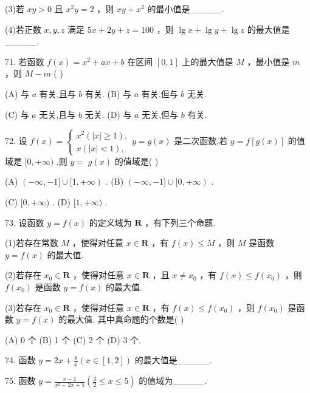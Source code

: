 \documentclass[10pt]{article}
\begin{document}
(3)若 \({xy} > 0\) 且 \({x}^{2}y = 2\) ，则 \({xy} + {x}^{2}\) 的最小值是\_\_\_\_\_.

(4)若正数 \(x,y,z\) 满足 \({5x} + {2y} + z = {100}\) ，则 \(\lg x + \lg y + \lg z\) 的最大值是\_\_\_\_\_.

71. 若函数 \(f\left( x\right)  = {x}^{2} + {ax} + b\) 在区间 \(\left\lbrack  {0,1}\right\rbrack\) 上的最大值是 \(M\) ，最小值是 \(m\) ，则 \(M - m\) ( )

(A) 与 \(a\) 有关,且与 \(b\) 有关. (B) 与 \(a\) 有关,但与 \(b\) 无关.

(C) 与 \(a\) 无关,且与 \(b\) 无关. (D) 与 \(a\) 无关,但与 \(b\) 有关.

72. 设 \(f\left( x\right)  = \left\{  {\begin{array}{l} {x}^{2}\left( {\left| x\right|  \geq  1}\right) , \\  x\left( {\left| x\right|  < 1}\right) , \end{array}y = g\left( x\right) }\right.\) 是二次函数,若 \(y = f\left\lbrack  {g\left( x\right) }\right\rbrack\) 的值域是 \(\lbrack 0, + \infty )\) ,则 \(y = \; g\left( x\right)\) 的值域是( )

(A) \(\left( {-\infty , - 1\rbrack \cup \lbrack 1, + \infty }\right)\) . (B) \(\left( {-\infty , - 1\rbrack \cup \lbrack 0, + \infty }\right)\) .

(C) \(\lbrack 0, + \infty )\) . (D) \(\lbrack 1, + \infty )\) .

73. 设函数 \(y = f\left( x\right)\) 的定义域为 \(\mathbf{R}\) ，有下列三个命题.

(1)若存在常数 \(M\) ，使得对任意 \(x \in  \mathbf{R}\) ，有 \(f\left( x\right)  \leq  M\) ，则 \(M\) 是函数 \(y = f\left( x\right)\) 的最大值.

(2)若存在 \({x}_{0} \in  \mathbf{R}\) ，使得对任意 \(x \in  \mathbf{R}\) ，且 \(x \neq  {x}_{0}\) ，有 \(f\left( x\right)  \leq  f\left( {x}_{0}\right)\) ，则 \(f\left( {x}_{0}\right)\) 是函数 \(y = f\left( x\right)\) 的最大值.

(3)若存在 \({x}_{0} \in  \mathbf{R}\) ，使得对任意 \(x \in  \mathbf{R}\) ，有 \(f\left( x\right)  \leq  f\left( {x}_{0}\right)\) ，则 \(f\left( {x}_{0}\right)\) 是函数 \(y = f\left( x\right)\) 的最大值. 其中真命题的个数是( )

(A) 0 个 (B) 1 个 (C) 2 个 (D) 3 个.

74. 函数 \(y = {2x} + \frac{8}{x}\left( {x \in  \left\lbrack  {1,2}\right\rbrack  }\right)\) 的最大值是\_\_\_\_\_.

75. 函数 \(y = \frac{x - 1}{{x}^{2} - {2x} + 5}\left( {\frac{3}{2} \leq  x \leq  5}\right)\) 的值域为\_\_\_\_\_.
\end{document}
